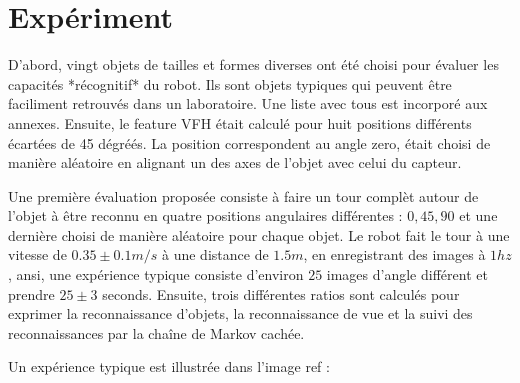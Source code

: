 \section {Expériment}

D'abord, vingt objets de tailles et formes diverses ont été choisi pour évaluer les capacités *récognitif* du robot. Ils sont objets typiques qui peuvent être faciliment retrouvés dans un laboratoire. Une liste avec tous est incorporé aux annexes. Ensuite, le feature VFH était calculé pour huit positions différents écartées de 45 dégréés. La position correspondent au angle zero, était choisi de manière aléatoire en alignant un des axes de l'objet avec celui du capteur. 

\begin{figure}[H]
\end{figure}

Une première évaluation proposée consiste à faire un tour complèt autour de l'objet à être reconnu en quatre positions angulaires différentes : $0, 45, 90$ et une dernière choisi de manière aléatoire pour chaque objet. Le robot fait le tour à une vitesse de $0.35 \pm 0.1 m/s$ à une distance de $1.5m$, en enregistrant des images à $1hz$, ansi, une expérience typique consiste d'environ $25$  images d'angle différent et prendre $25 \pm 3$ seconds. Ensuite, trois différentes ratios sont calculés pour exprimer la reconnaissance d'objets, la reconnaissance de vue et la suivi des reconnaissances par la chaîne de Markov cachée.

Un expérience typique est illustrée dans l'image {\color{green} ref} :

\begin{figure}[H]
\end{figure}

